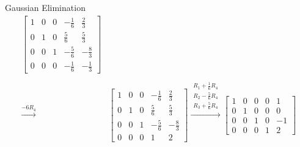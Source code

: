 \documentclass{beamer}
\begin{document}
\begin{frame}{Gaussian Elimination}
{\begin{align*}
\left[ 
    \begin{array}{cccc|c}
    1 & 0 & 0 & -\frac{1}{6} & \frac{2}{3} \\
    0 & 1 & 0 & \frac{5}{6} & \frac{5}{3} \\
    0 & 0 & 1 & -\frac{5}{6} & -\frac{8}{3} \\
    0 & 0 & 0 & -\frac{1}{6} & -\frac{1}{3}
    \end{array}
\right] \\ \\ 
\xrightarrow{-6R_4}
&\left[ 
    \begin{array}{cccc|c}
    1 & 0 & 0 & -\frac{1}{6} & \frac{2}{3} \\
    0 & 1 & 0 & \frac{5}{6} & \frac{5}{3} \\
    0 & 0 & 1 & -\frac{5}{6} & -\frac{8}{3} \\
    0 & 0 & 0 & 1 & 2
    \end{array}
\right]
\xrightarrow{\substack{R_1 + \frac{1}{6}R_4 \\ R_2 - \frac{5}{6}R_4 \\ R_3 + \frac{5}{6}R_4}}
\left[ 
    \begin{array}{cccc|c}
    1 & 0 & 0 & 0 & 1 \\
    0 & 1 & 0 & 0 & 0 \\
    0 & 0 & 1 & 0 & -1 \\
    0 & 0 & 0 & 1 & 2
    \end{array}
\right]
\end{align*}
}
\end{frame}
\end{document}
